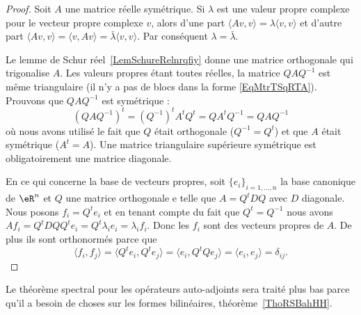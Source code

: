 \begin{proof}
    Soit \( A\) une matrice réelle symétrique. Si \( \lambda\) est une valeur propre complexe pour le vecteur propre complexe \( v\), alors d'une part \( \langle Av, v\rangle =\lambda\langle v, v\rangle \) et d'autre part \( \langle Av, v\rangle =\langle v, Av\rangle =\bar\lambda\langle v, v\rangle \). Par conséquent \( \lambda=\bar\lambda\).

    Le lemme de Schur réel~\ref{LemSchureRelnrqfiy} donne une matrice orthogonale qui trigonalise \( A\). Les valeurs propres étant toutes réelles, la matrice \( QAQ^{-1}\) est même triangulaire (il n'y a pas de blocs dans la forme \eqref{EqMtrTSqRTA}). Prouvons que \( QAQ^{-1}\) est symétrique :
    \begin{equation}
        (QAQ^{-1})^t=(Q^{-1})^tA^tQ^t=QA^tQ^{-1}=QAQ^{-1}
    \end{equation}
    où nous avons utilisé le fait que \( Q\) était orthogonale (\( Q^{-1}=Q^t\)) et que \( A\) était symétrique (\( A^t=A\)). Une matrice triangulaire supérieure symétrique est obligatoirement une matrice diagonale.

    En ce qui concerne la base de vecteurs propres, soit \( \{ e_i \}_{i=1,\ldots, n}\) la base canonique de \( \eR^n\) et \( Q\) une matrice orthogonale e telle que \( A=Q^tDQ\) avec \( D\) diagonale. Nous posons \( f_i=Q^te_i\) et en tenant compte du fait que \( Q^t=Q^{-1}\) nous avons \( Af_i=Q^tDQQ^te_i=Q^t\lambda_i e_i=\lambda_if_i\). Donc les \( f_i\) sont des vecteurs propres de \( A\). De plus ils sont orthonormés parce que
    \begin{equation}
        \langle f_i, f_j\rangle =\langle Q^te_i, Q^te_j\rangle =\langle e_i, Q^tQe_j\rangle =\langle e_i, e_j\rangle =\delta_{ij}.
    \end{equation}
\end{proof}
Le théorème spectral pour les opérateurs auto-adjoints sera traité plus bas parce qu'il a besoin de choses sur les formes bilinéaires, théorème~\ref{ThoRSBahHH}.

